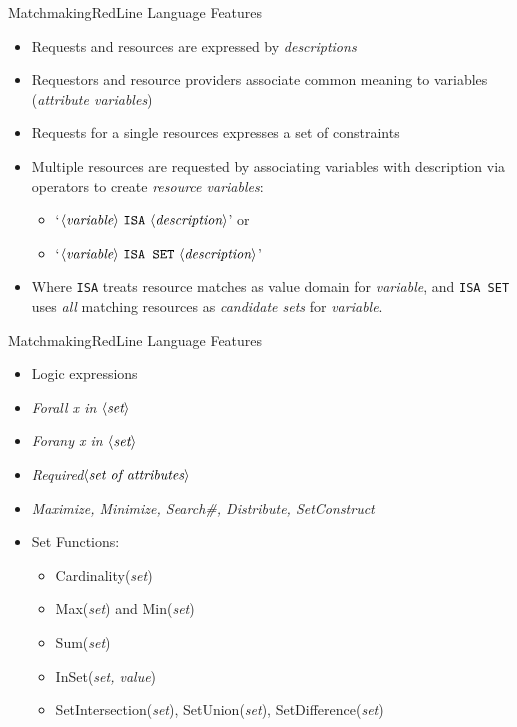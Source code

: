 \documentclass{beamer}
\begin{document}
\begin{frame}{Matchmaking}{RedLine Language Features}
\begin{itemize}
 \item<+-> Requests and resources are expressed by {\em descriptions}
 \item<+-> Requestors and resource providers associate common meaning to
           variables ({\em attribute variables})
 \item<+-> Requests for a single resources expresses a set of constraints
 \item<+-> Multiple resources are requested by associating variables with
           description via operators to create {\em resource variables}:
 \begin{itemize}
   \item<+-> `$\langle\text{\em variable}\rangle\ \text{\tt ISA}\ \langle\text{\em description}\rangle$'  or
   \item<+-> `$\langle\text{\em variable}\rangle\ \text{\tt ISA SET}\ \langle\text{\em description}\rangle$'
 \end{itemize}
 \item<+-> Where {\tt ISA} treats resource matches as value domain for
           {\em variable}, and {\tt ISA SET} uses {\em all} matching
           resources as {\em candidate sets} for {\em variable}.
\end{itemize}
\end{frame}

\begin{frame}{Matchmaking}{RedLine Language Features}
\begin{itemize}
 \item<+-> Logic expressions
 \item<+-> {\em Forall x in }$\langle\text{\em set}\rangle$
 \item<+-> {\em Forany x in }$\langle\text{\em set}\rangle$
 \item<+-> {\em Required}$\langle\text{\em set of attributes}\rangle$
 \item<+-> {\em Maximize, Minimize, Search\#, Distribute, SetConstruct}
 \item<+-> Set Functions:
 \begin{itemize}
  \item<+-> Cardinality({\em set})
  \item<+-> Max({\em set}) and Min({\em set})
  \item<+-> Sum({\em set})
  \item<+-> InSet({\em set, value})
  \item<+-> SetIntersection({\em set}), SetUnion({\em set}), SetDifference({\em set})
 \end{itemize}
\end{itemize}
\end{frame}
\end{document}
